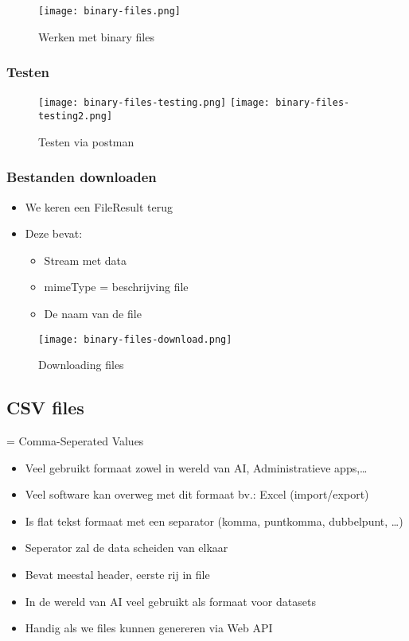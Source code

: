 \documentclass{article}
\begin{document}
\begin{figure}[H]
    \centering
    \texttt{[image: binary-files.png]}
    \caption{Werken met binary files}
\end{figure}

\subsubsection{Testen}

\begin{figure}[H]
    \centering
    \texttt{[image: binary-files-testing.png]}
    \texttt{[image: binary-files-testing2.png]}
    \caption{Testen via postman}
\end{figure}

\subsubsection{Bestanden downloaden}

\begin{itemize}
    \item We keren een FileResult terug
    \item Deze bevat:
    \begin{itemize}
        \item Stream met data
        \item mimeType = beschrijving file
        \item De naam van de file
    \end{itemize}
\end{itemize}

\begin{figure}[H]
    \centering
    \texttt{[image: binary-files-download.png]}
    \caption{Downloading files}
\end{figure}

\subsection{CSV files}

= Comma-Seperated Values

\begin{itemize}
    \item Veel gebruikt formaat zowel in wereld van AI, Administratieve apps,\dots
    \item Veel software kan overweg met dit formaat bv.: Excel (import/export)
    \item Is flat tekst formaat met een separator (komma, puntkomma, dubbelpunt, \dots)
    \item Seperator zal de data scheiden van elkaar
    \item Bevat meestal header, eerste rij in file
    \item In de wereld van AI veel gebruikt als formaat voor datasets
    \item Handig als we files kunnen genereren via Web API
\end{itemize}
\end{document}
